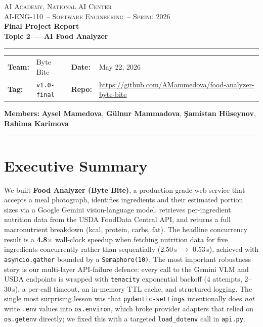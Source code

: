 \documentclass[11pt,a4paper]{article}
\newcommand{\teamname}{Byte Bite}
\newcommand{\topicchoice}{Topic 2 --- AI Food Analyzer}
\newcommand{\member}[1]{\textbf{#1}}
\newcommand{\reportdate}{May 22, 2026}
\newcommand{\repourl}{https://github.com/AMammedova/food-analyzer-byte-bite}
\newcommand{\coursecode}{AI-ENG-110}
\newcommand{\coursename}{Software Engineering}
\newcommand{\institution}{AI Academy, National AI Center}
\newcommand{\semester}{Spring 2026}
\begin{document}
\begin{center}
{\small \textsc{\institution} \\[0.2em]
 \textsc{\coursecode\ -- \coursename\ -- \semester}}\\[1.2em]
{\Large\bfseries\color{accent} Final Project Report}\\[0.3em]
{\LARGE\bfseries \topicchoice}\\[0.8em]
\rule{0.85\textwidth}{0.6pt}
\end{center}

\vspace{0.5em}
\begin{tabularx}{\textwidth}{@{}lX lX@{}}
\textbf{Team:}  & \teamname          & \textbf{Date:} & \reportdate \\
\textbf{Tag:}   & \texttt{v1.0-final}& \textbf{Repo:} & \small\url{\repourl} \\
\end{tabularx}

\smallskip
\noindent\textbf{Members:}\enspace
\member{Aysel Mamedova},\enspace
\member{Gülnur Mammadova},\enspace
\member{Şamistan Hüseynov},\enspace
\member{Rahima Karimova}

\vspace{0.4em}\hrule\vspace{0.6em}

\section*{Executive Summary}

We built \textbf{Food Analyzer (Byte Bite)}, a production-grade web service that accepts a meal photograph, identifies ingredients and their estimated portion sizes via a Google Gemini vision-language model, retrieves per-ingredient nutrition data from the USDA FoodData Central API, and returns a full macronutrient breakdown (kcal, protein, carbs, fat).
The headline concurrency result is a \textbf{4.8$\times$} wall-clock speedup when fetching nutrition data for five ingredients concurrently rather than sequentially (2.50\,s $\to$ 0.53\,s), achieved with \texttt{asyncio.gather} bounded by a \texttt{Semaphore(10)}.
The most important robustness story is our multi-layer API-failure defence: every call to the Gemini VLM and USDA endpoints is wrapped with \texttt{tenacity} exponential backoff (4 attempts, 2--30\,s), a per-call timeout, an in-memory TTL cache, and structured logging.
The single most surprising lesson was that \texttt{pydantic-settings} intentionally does \emph{not} write \texttt{.env} values into \texttt{os.environ}, which broke provider adapters that relied on \texttt{os.getenv} directly; we fixed this with a targeted \texttt{load\_dotenv} call in \texttt{api.py}.
\end{document}
